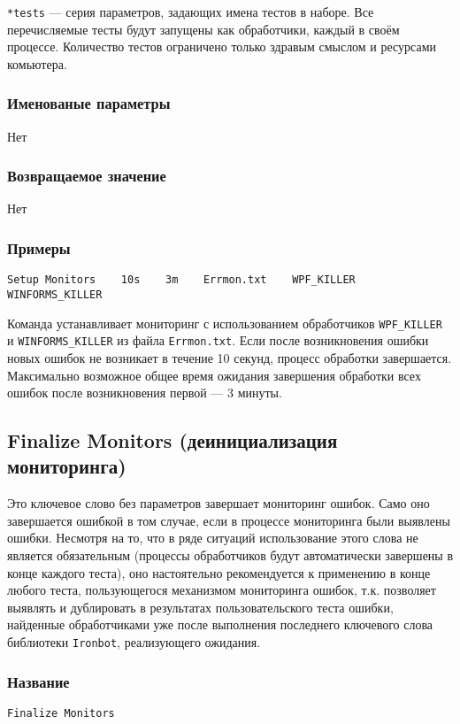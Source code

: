 \documentclass[11pt]{book} %
\begin{document}
\verb"*tests" --- серия параметров, задающих имена тестов в наборе. Все перечисляемые тесты будут запущены как обработчики, каждый в своём процессе. Количество тестов ограничено только здравым смыслом и ресурсами комьютера.


\subsubsection*{Именованые параметры} 
Нет


\subsubsection*{Возвращаемое значение} 
Нет

\subsubsection*{Примеры}
\begin{verbatim}Setup Monitors    10s    3m    Errmon.txt    WPF_KILLER    WINFORMS_KILLER\end{verbatim}

Команда устанавливает мониторинг с использованием обработчиков \verb|WPF_KILLER| и \verb|WINFORMS_KILLER| из файла \verb|Errmon.txt|. Если после возникновения ошибки новых ошибок не возникает в течение 10 секунд, процесс обработки завершается. Максимально возможное общее время ожидания завершения обработки всех ошибок после возникновения первой --- 3 минуты. 






\subsection{Finalize Monitors (деинициализация мониторинга)}
    Это ключевое слово без параметров завершает мониторинг ошибок. Само оно завершается ошибкой в том случае, если в процессе мониторинга были выявлены ошибки. Несмотря на то, что в ряде ситуаций использование этого слова не является обязательным (процессы обработчиков будут автоматически завершены в конце каждого теста), оно настоятельно рекомендуется к применению в конце любого теста, пользующегося механизмом мониторинга ошибок, т.к. позволяет выявлять и дублировать в результатах пользовательского теста ошибки, найденные обработчиками уже после выполнения последнего ключевого слова библиотеки \verb|Ironbot|, реализующего ожидания.

\subsubsection*{Название} 
\verb"Finalize Monitors"
\end{document}
